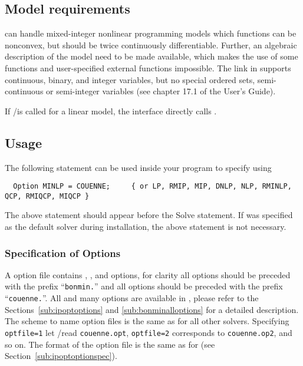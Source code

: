 \subsection{Model requirements}

\COUENNE can handle mixed-integer nonlinear programming models which functions can be nonconvex, but should be twice continuously differentiable. Further, an algebraic description of the model need to be made available, which makes the use of some \MYGAMS functions and user-specified external functions impossible.
The \COUENNE link in \MYGAMS supports continuous, binary, and integer variables, but no special ordered sets, semi-continuous or semi-integer variables (see chapter 17.1 of the \MYGAMS User's Guide).

If \MYGAMS/\COUENNE is called for a linear model, the interface directly calls \CBC.

\subsection{Usage}

The following statement can be used inside your \MYGAMS program to specify using \COUENNE
\begin{verbatim}
  Option MINLP = COUENNE;     { or LP, RMIP, MIP, DNLP, NLP, RMINLP, QCP, RMIQCP, MIQCP }
\end{verbatim}

The above statement should appear before the Solve statement.
If \COUENNE was specified as the default solver during \MYGAMS installation, the above statement is not necessary.

\subsubsection{Specification of Options}

A \COUENNE option file contains \IPOPT, \BONMIN, and \COUENNE options, for clarity all \BONMIN options should be preceded with the prefix ``\texttt{bonmin.}'' and all \COUENNE options should be preceded with the prefix ``\texttt{couenne.}''.
All \IPOPT and many \BONMIN options are available in \COUENNE, please refer to the Sections~\ref{sub:ipoptoptions} and \ref{sub:bonminalloptions} for a detailed description.
The scheme to name option files is the same as for all other \MYGAMS solvers.
Specifying \texttt{optfile=1} let \MYGAMS/\COUENNE read \texttt{couenne.opt}, \texttt{optfile=2} corresponds to \texttt{couenne.op2}, and so on.
The format of the option file is the same as for \IPOPT (see Section~\ref{sub:ipoptoptionspec}).

